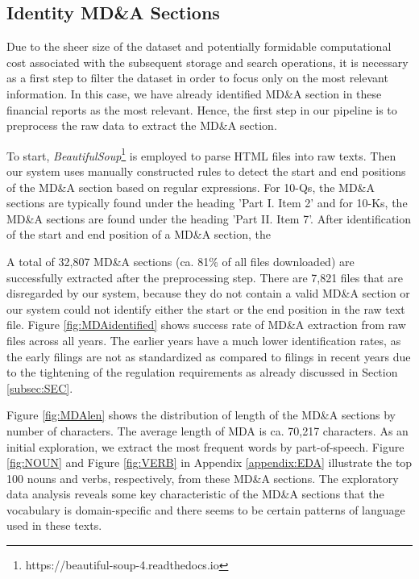 \subsection {Identity MD\&A Sections}

Due to the sheer size of the dataset and potentially formidable computational cost associated with the subsequent storage and search operations, it is necessary as a first step to filter the dataset in order to focus only on the most relevant information. In this case, we have already identified MD\&A section in these financial reports as the most relevant. Hence, the first step in our pipeline is to preprocess the raw data to extract the MD\&A section. 

To start, \emph{BeautifulSoup}\footnote{https://beautiful-soup-4.readthedocs.io} is employed to parse HTML files into raw texts. Then our system uses manually constructed rules to detect the start and end positions of the MD\&A section based on regular expressions. For 10-Qs, the MD\&A sections are typically found under the heading 'Part I.  Item 2' and for 10-Ks, the MD\&A sections are found under the heading 'Part II. Item 7'. After identification of the start and end position of a MD\&A section, the   

A total of 32,807 MD\&A sections (ca. 81\% of all files downloaded) are successfully extracted after the preprocessing step. There are 7,821 files that are disregarded by our system, because they do not contain a valid MD\&A section or our system could not identify either the start or the end position in the raw text file. Figure \ref{fig:MDAidentified} shows success rate of MD\&A extraction from raw files across all years. The earlier years have a much lower identification rates, as the early filings are not as standardized as compared to filings in recent years due to the tightening of the regulation requirements as already discussed in Section \ref{subsec:SEC}.

Figure \ref{fig:MDAlen} shows the distribution of length of the MD\&A sections by number of characters. The average length of MDA is ca. 70,217 characters. As an initial exploration, we extract the most frequent words by part-of-speech. Figure \ref{fig:NOUN} and Figure \ref{fig:VERB} in Appendix \ref{appendix:EDA} illustrate the top 100 nouns and verbs, respectively, from these MD\&A sections. The exploratory data analysis reveals some key characteristic of the MD\&A sections that the vocabulary is domain-specific and there seems to be certain patterns of language used in these texts.

